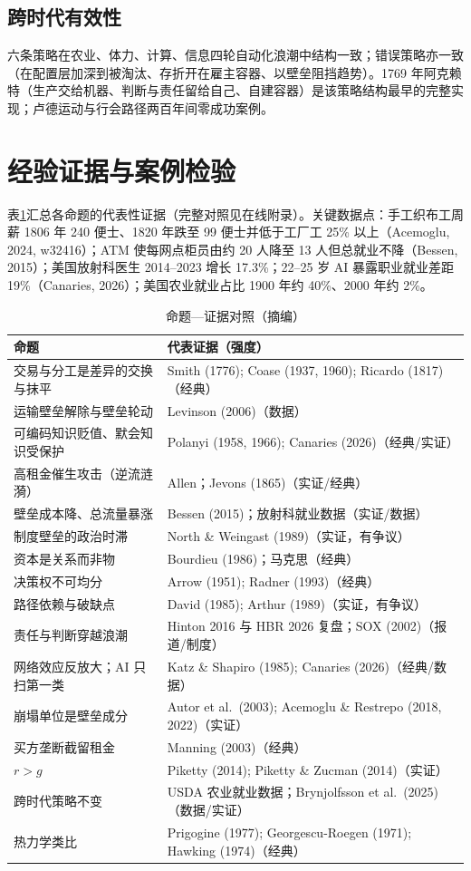 \documentclass[11pt]{ctexart}
\begin{document}
\subsection{跨时代有效性}
六条策略在农业、体力、计算、信息四轮自动化浪潮中结构一致；错误策略亦一致（在配置层加深到被淘汰、存折开在雇主容器、以壁垒阻挡趋势）。1769 年阿克赖特（生产交给机器、判断与责任留给自己、自建容器）是该策略结构最早的完整实现；卢德运动与行会路径两百年间零成功案例。

\section{经验证据与案例检验}
表\ref{tab:evidence}汇总各命题的代表性证据（完整对照见在线附录）。关键数据点：手工织布工周薪 1806 年 240 便士、1820 年跌至 99 便士并低于工厂工 25\% 以上（Acemoglu, 2024, w32416）；ATM 使每网点柜员由约 20 人降至 13 人但总就业不降（Bessen, 2015）；美国放射科医生 2014--2023 增长 17.3\%；22--25 岁 AI 暴露职业就业差距 19\%（Canaries, 2026）；美国农业就业占比 1900 年约 40\%、2000 年约 2\%。

\begin{table}[h]
\centering\small
\caption{命题—证据对照（摘编）}
\label{tab:evidence}
\begin{tabular}{p{}p{}}
\toprule
命题 & 代表证据（强度）\\
\midrule
交易与分工是差异的交换与抹平 & Smith (1776); Coase (1937, 1960); Ricardo (1817)（经典）\\
运输壁垒解除与壁垒轮动 & Levinson (2006)（数据）\\
可编码知识贬值、默会知识受保护 & Polanyi (1958, 1966); Canaries (2026)（经典/实证）\\
高租金催生攻击（逆流涟漪） & Allen；Jevons (1865)（实证/经典）\\
壁垒成本降、总流量暴涨 & Bessen (2015)；放射科就业数据（实证/数据）\\
制度壁垒的政治时滞 & North \& Weingast (1989)（实证，有争议）\\
资本是关系而非物 & Bourdieu (1986)；马克思（经典）\\
决策权不可均分 & Arrow (1951); Radner (1993)（经典）\\
路径依赖与破缺点 & David (1985); Arthur (1989)（实证，有争议）\\
责任与判断穿越浪潮 & Hinton 2016 与 HBR 2026 复盘；SOX (2002)（报道/制度）\\
网络效应反放大；AI 只扫第一类 & Katz \& Shapiro (1985); Canaries (2026)（经典/数据）\\
崩塌单位是壁垒成分 & Autor et al.\ (2003); Acemoglu \& Restrepo (2018, 2022)（实证）\\
买方垄断截留租金 & Manning (2003)（经典）\\
$r>g$ & Piketty (2014); Piketty \& Zucman (2014)（实证）\\
跨时代策略不变 & USDA 农业就业数据；Brynjolfsson et al.\ (2025)（数据/实证）\\
热力学类比 & Prigogine (1977); Georgescu-Roegen (1971); Hawking (1974)（经典）\\
\bottomrule
\end{tabular}
\end{table}
\end{document}
